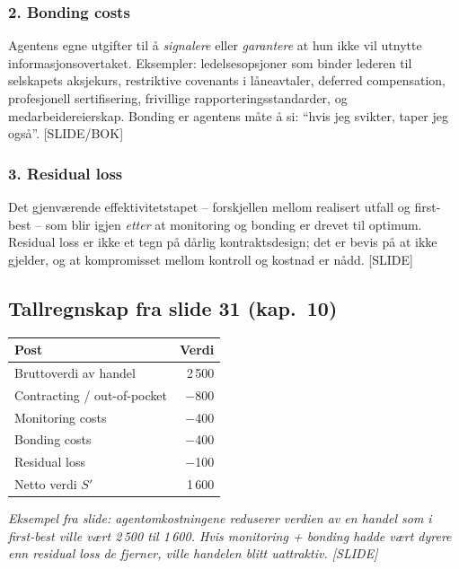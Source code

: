 \subsubsection*{2. Bonding costs}
Agentens egne utgifter til å \emph{signalere} eller \emph{garantere} at hun ikke vil utnytte informasjonsovertaket. Eksempler: ledelsesopsjoner som binder lederen til selskapets aksjekurs, restriktive covenants i låneavtaler, deferred compensation, profesjonell sertifisering, frivillige rapporteringsstandarder, og medarbeidereierskap. Bonding er agentens måte å si: ``hvis jeg svikter, taper jeg også''. [SLIDE/BOK]

\subsubsection*{3. Residual loss}
Det gjenværende effektivitetstapet -- forskjellen mellom realisert utfall og first-best -- som blir igjen \emph{etter} at monitoring og bonding er drevet til optimum. Residual loss er ikke et tegn på dårlig kontraktsdesign; det er bevis på at  ikke gjelder, og at kompromisset mellom kontroll og kostnad er nådd. [SLIDE]

\subsection*{Tallregnskap fra slide 31 (kap.\ 10)}

\begin{center}
\begin{tabular}{@{}lr@{}}
\toprule
\textbf{Post} & \textbf{Verdi} \\
\midrule
Bruttoverdi av handel & 2\,500 \\
Contracting / out-of-pocket & $-$800 \\
Monitoring costs & $-$400 \\
Bonding costs & $-$400 \\
Residual loss & $-$100 \\
\midrule
Netto verdi $S'$ & 1\,600 \\
\bottomrule
\end{tabular}
\end{center}
\textit{Eksempel fra slide: agentomkostningene reduserer verdien av en handel som i first-best ville vært 2\,500 til 1\,600. Hvis monitoring + bonding hadde vært dyrere enn residual loss de fjerner, ville handelen blitt uattraktiv. [SLIDE]}

